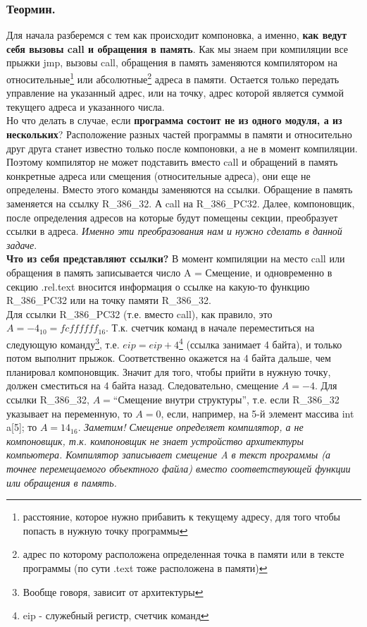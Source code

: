 \documentclass[12pt, letterpaper]{article}
\begin{document}
\subsubsection{Теормин.}
Для начала разберемся с тем как происходит компоновка, а именно, \textbf{как ведут себя вызовы call и обращения в память}. Как мы знаем при компиляции все прыжки jmp, вызовы call, обращения в память заменяются компилятором на относительные\footnote{расстояние, которое нужно прибавить к текущему адресу, для того чтобы попасть в нужную точку программы} или абсолютные\footnote{адрес по которому расположена определенная точка в памяти или в тексте программы (по сути .text тоже расположена в памяти)} адреса в памяти. Остается только передать управление на указанный адрес, или на точку, адрес которой является суммой текущего адреса и указанного числа.\\

Но что делать в случае, если \textbf{программа состоит не из одного модуля, а из нескольких}? Расположение разных частей программы в памяти и относительно друг друга станет известно только после компоновки, а не в момент компиляции. Поэтому компилятор не может подставить вместо call и обращений в память конкретные адреса или смещения (относительные адреса), они еще не определены. Вместо этого команды заменяются на ссылки. Обращение в память заменяется на ссылку R\_386\_32. А call на R\_386\_PC32. Далее, компоновщик, после определения адресов на которые будут помещены секции, преобразует ссылки в адреса. \textit{Именно эти преобразования нам и нужно сделать в данной задаче}.\\

\textbf{Что из себя представляют ссылки?} В момент компиляции на место call или обращения в память записывается число A = Смещение, и одновременно в секцию .rel.text вносится информация о ссылке на какую-то функцию R\_386\_PC32 или на точку памяти R\_386\_32.\\

Для ссылки R\_386\_PC32 (т.е. вместо call), как правило, это $A = -4_{10} = fcffffff_{16}$. Т.к. счетчик команд в начале переместиться на следующую команду\footnote{Вообще говоря, зависит от архитектуры}, т.е. $eip=eip+4$\footnote{eip - служебный регистр, счетчик команд} (ссылка занимает 4 байта), и только потом выполнит прыжок. Соответственно окажется на 4 байта дальше, чем планировал компоновщик. Значит для того, чтобы прийти в нужную точку, должен сместиться на 4 байта назад. Следовательно, смещение $A=-4$. Для ссылки R\_386\_32, $A=$``Смещение внутри структуры'', т.е. если R\_386\_32 указывает на переменную, то $A=0$, если, например, на 5-й элемент массива int a[5]; то $A=14_{16}$. \textit{Заметим! Смещение определяет компилятор, а не компоновщик, т.к. компоновщик не знает устройство архитектуры компьютера. Компилятор записывает смещение A в текст программы (а точнее перемещаемого объектного файла) вместо соответствующей функции или обращения в память.}\\
\end{document}
